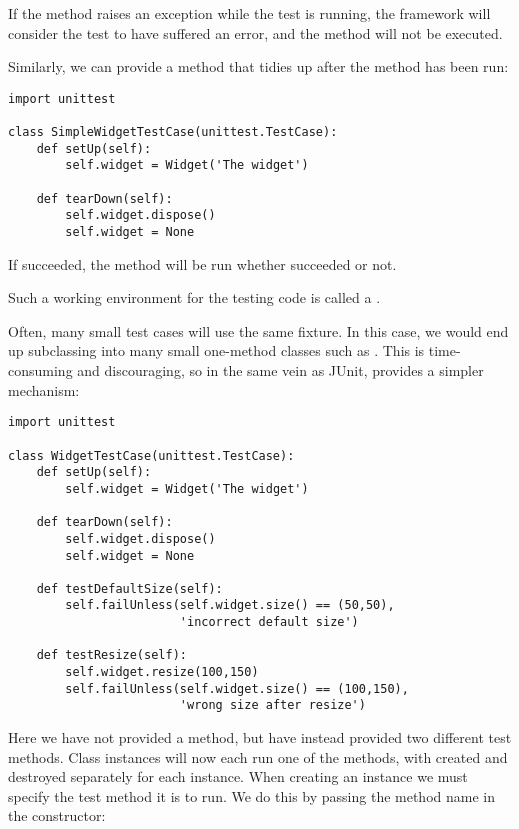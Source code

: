 If the  method raises an exception while the test is
running, the framework will consider the test to have suffered an
error, and the  method will not be executed.

Similarly, we can provide a  method that tidies up
after the  method has been run:

\begin{verbatim}
import unittest

class SimpleWidgetTestCase(unittest.TestCase):
    def setUp(self):
        self.widget = Widget('The widget')

    def tearDown(self):
        self.widget.dispose()
        self.widget = None
\end{verbatim}

If  succeeded, the  method will be
run whether  succeeded or not.

Such a working environment for the testing code is called a
.

Often, many small test cases will use the same fixture.  In this case,
we would end up subclassing  into many
small one-method classes such as
.  This is time-consuming and
discouraging, so in the same vein as JUnit,  provides
a simpler mechanism:

\begin{verbatim}
import unittest

class WidgetTestCase(unittest.TestCase):
    def setUp(self):
        self.widget = Widget('The widget')

    def tearDown(self):
        self.widget.dispose()
        self.widget = None

    def testDefaultSize(self):
        self.failUnless(self.widget.size() == (50,50),
                        'incorrect default size')

    def testResize(self):
        self.widget.resize(100,150)
        self.failUnless(self.widget.size() == (100,150),
                        'wrong size after resize')
\end{verbatim}

Here we have not provided a  method, but have
instead provided two different test methods.  Class instances will now
each run one of the   methods, with 
created and destroyed separately for each instance.  When creating an
instance we must specify the test method it is to run.  We do this by
passing the method name in the constructor:

